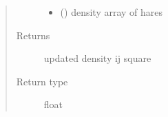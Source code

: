\documentclass[letterpaper,10pt,english]{sphinxmanual}
\begin{document}
\begin{fulllineitems}
\begin{fulllineitems}
\begin{quote}
\begin{description}
\begin{itemize}
\item {} 
 () \textendash{} density array of hares

\end{itemize}

\item[{Returns}] \leavevmode
updated density ij square

\item[{Return type}] \leavevmode
float

\end{description}\end{quote}

\end{fulllineitems}


\end{fulllineitems}

\end{document}
